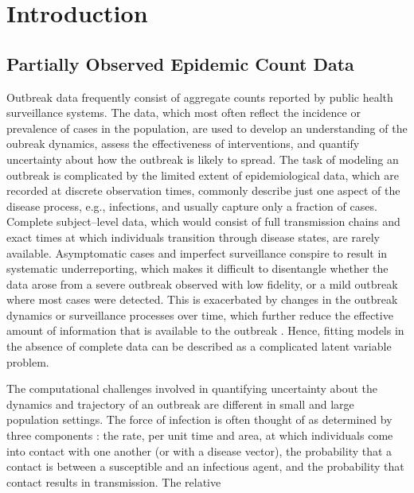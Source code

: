 \chapter{Introduction}
\label{chap:introduction}

\section{Partially Observed Epidemic Count Data}
\label{sec:data_background}

Outbreak data frequently consist of aggregate counts reported by public health surveillance systems. The data, which most often reflect the incidence or prevalence of cases in the population, are used to develop an understanding of the oubreak dynamics, assess the effectiveness of interventions, and quantify uncertainty about how the outbreak is likely to spread. The task of modeling an outbreak is complicated by the limited extent of epidemiological data, which are recorded at discrete observation times, commonly describe just one aspect of the disease process, e.g., infections, and usually capture only a fraction of cases. Complete subject--level data, which would consist of full transmission chains and exact times at which individuals transition through disease states, are rarely available. Asymptomatic cases and imperfect surveillance conspire to result in systematic underreporting, which makes it difficult to disentangle whether the data arose from a severe outbreak observed with low fidelity, or a mild outbreak where most cases were detected. This is exacerbated by changes in the outbreak dynamics or surveillance processes over time, which further reduce the effective amount of information that is available to   the outbreak . Hence, fitting models in the absence of complete data can be described as a complicated latent variable problem. 

The computational challenges involved in quantifying uncertainty about the dynamics and trajectory of an outbreak are different in small and large population settings. The force of infection is often thought of as determined by three components \cite{dejong1995does,mccallum2001should}: the rate, per unit time and area, at which individuals come into contact with one another (or with a disease vector), the probability that a contact is between a susceptible and an infectious agent, and the probability that contact results in transmission. The relative 

